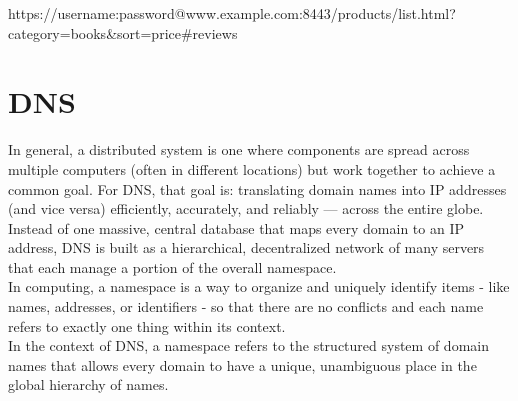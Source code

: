 \documentclass{article}
\begin{document}
\begin{center} https://username:password@www.example.com:8443/products/list.html?category=books\&sort=price\#reviews \end{center}

\section*{DNS}
In general, a distributed system is one where components are spread across multiple computers (often in different locations) but work together to achieve a common goal. For DNS, that goal is: translating domain names into IP addresses (and vice versa) efficiently, accurately, and reliably — across the entire globe.\\

Instead of one massive, central database that maps every domain to an IP address, DNS is built as a hierarchical, decentralized network of many servers that each manage a portion of the overall namespace.\\

In computing, a namespace is a way to organize and uniquely identify items - like names, addresses, or identifiers - so that there are no conflicts and each name refers to exactly one thing within its context.\\

In the context of DNS, a namespace refers to the structured system of domain names that allows every domain to have a unique, unambiguous place in the global hierarchy of names.\\
\end{document}
